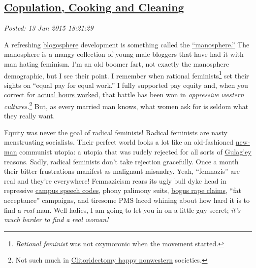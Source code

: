 %

\subsection*{\href{https://bakerjd99.wordpress.com/2015/06/13/copulation-cooking-and-cleaning/}{Copulation, Cooking and Cleaning}}


\noindent\emph{Posted: 13 Jun 2015 18:21:29}
\vspace{6pt}

A refreshing
\href{http://www.merriam-webster.com/dictionary/blogosphere}{blogosphere}
development is something called the
\href{http://www.urbandictionary.com/define.php?term=Manosphere}{``manosphere.''}
The manosphere is a mangy collection of young male bloggers that have
had it with man hating feminism. I'm an old boomer fart, not exactly the
manosphere demographic, but I see their point. I remember when
rational feminists\footnote{\emph{Rational feminist} was not oxymoronic when the movement started.
} set %
their sights on ``equal pay for equal work.'' I fully
supported pay equity and, when you correct for
\href{http://www.forbes.com/sites/realspin/2012/04/16/its-time-that-we-end-the-equal-pay-myth/}{actual
hours worked}, that battle has been won in \emph{oppressive western
cultures.}\footnote{Not such much in
\href{http://thefederalist.com/2014/07/07/the-pathetic-provincialism-of-american-feminists/}{Clitoridectomy
happy nonwestern} societies.
} But, %
as every married man knows, what women ask for is seldom what they
really want.

Equity was never the goal of radical feminists! Radical feminists are
nasty menstruating socialists. Their perfect world looks a lot like an
old-fashioned
\href{http://en.wikipedia.org/wiki/New_Soviet_man}{new-man} communist
utopia: a utopia that was rudely rejected for all sorts of
\href{http://www.slate.com/articles/news_and_politics/foreigners/2008/08/death_of_a_writer.html}{Gulag'ey}
reasons. Sadly, radical feminists don't take rejection gracefully. Once
a month their bitter frustrations manifest as malignant misandry. Yeah,
``femnazis'' are real and they're everywhere! Femnazicism rears its ugly
bull dyke head in repressive
\href{http://www.nytimes.com/2015/03/22/opinion/sunday/judith-shulevitz-hiding-from-scary-ideas.html?_r=0}{campus
speech codes}, phony palimony suits,
\href{https://en.wikipedia.org/wiki/False_accusation_of_rape}{bogus rape
claims}, ``fat acceptance'' campaigns, and tiresome PMS laced whining
about how hard it is to find a \emph{real} man. Well ladies, I am going
to let you in on a little guy secret; \emph{it's much harder to find a
real woman!}

